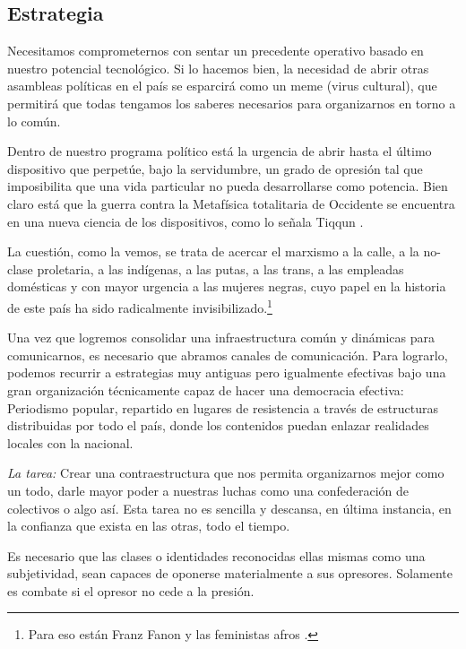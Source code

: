 \hypertarget{estrategia}{%
\subsection{Estrategia}\label{estrategia}}

Necesitamos comprometernos con sentar un precedente operativo basado en
nuestro potencial tecnológico. Si lo hacemos bien, la necesidad de abrir
otras asambleas políticas en el país se esparcirá como un meme (virus
cultural), que permitirá que todas tengamos los saberes necesarios para
organizarnos en torno a lo común.

Dentro de nuestro programa político está la urgencia de abrir hasta el
último dispositivo que perpetúe, bajo la servidumbre, un grado de
opresión tal que imposibilita que una vida particular no pueda
desarrollarse como potencia. Bien claro está que la guerra contra la
Metafísica totalitaria de Occidente se encuentra en una nueva ciencia de
los dispositivos, como lo señala
Tiqqun \cite{Tiqqun2015}.

La cuestión, como la vemos, se trata de acercar el marxismo a la calle,
a la no-clase proletaria, a las indígenas, a las putas, a las trans, a
las empleadas domésticas y con mayor urgencia a las mujeres negras, cuyo
papel en la historia de este país ha sido radicalmente
invisibilizado.\footnote{Para eso están Franz
  Fanon \cite{Fanon1965} y las feministas
  afros \cite{Jabardo2008}.}

Una vez que logremos consolidar una infraestructura común y dinámicas
para comunicarnos, es necesario que abramos canales de comunicación.
Para lograrlo, podemos recurrir a estrategias muy antiguas pero
igualmente efectivas bajo una gran organización técnicamente capaz de
hacer una democracia efectiva: Periodismo popular, repartido en lugares
de resistencia a través de estructuras distribuidas por todo el país,
donde los contenidos puedan enlazar realidades locales con la nacional.

\emph{La tarea:} Crear una contraestructura que nos permita organizarnos
mejor como un todo, darle mayor poder a nuestras luchas como una
confederación de colectivos o algo así. Esta tarea no es sencilla y
descansa, en última instancia, en la confianza que exista en las otras,
todo el tiempo.

Es necesario que las clases o identidades reconocidas ellas mismas como
una subjetividad, sean capaces de oponerse materialmente a sus
opresores. Solamente es combate si el opresor no cede a la presión.


